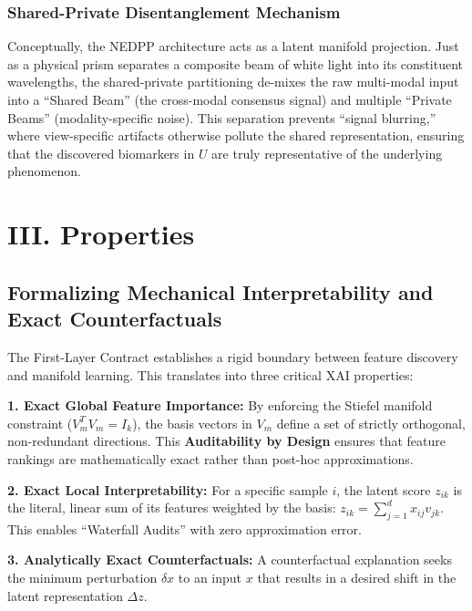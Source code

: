 \documentclass[
  letterpaper,
]{report}
\begin{document}
\subsubsection{Shared-Private Disentanglement
Mechanism}\label{shared-private-disentanglement-mechanism}

Conceptually, the NEDPP architecture acts as a latent manifold
projection. Just as a physical prism separates a composite beam of white
light into its constituent wavelengths, the shared-private partitioning
de-mixes the raw multi-modal input into a ``Shared Beam'' (the
cross-modal consensus signal) and multiple ``Private Beams''
(modality-specific noise). This separation prevents ``signal blurring,''
where view-specific artifacts otherwise pollute the shared
representation, ensuring that the discovered biomarkers in \(U\) are
truly representative of the underlying phenomenon.

\section{III. Properties}\label{iii.-properties}

\subsection{Formalizing Mechanical Interpretability and Exact
Counterfactuals}\label{formalizing-mechanical-interpretability-and-exact-counterfactuals}

The First-Layer Contract establishes a rigid boundary between feature
discovery and manifold learning. This translates into three critical XAI
properties:

\textbf{1. Exact Global Feature Importance:} By enforcing the Stiefel
manifold constraint (\(V_m^T V_m = I_k\)), the basis vectors in \(V_m\)
define a set of strictly orthogonal, non-redundant directions. This
\textbf{Auditability by Design} ensures that feature rankings are
mathematically exact rather than post-hoc approximations.

\textbf{2. Exact Local Interpretability:} For a specific sample \(i\),
the latent score \(z_{ik}\) is the literal, linear sum of its features
weighted by the basis: \(z_{ik} = \sum_{j=1}^d x_{ij} v_{jk}\). This
enables ``Waterfall Audits'' with zero approximation error.

\textbf{3. Analytically Exact Counterfactuals:} A counterfactual
explanation seeks the minimum perturbation \(\delta x\) to an input
\(x\) that results in a desired shift in the latent representation
\(\Delta z\).
\end{document}

